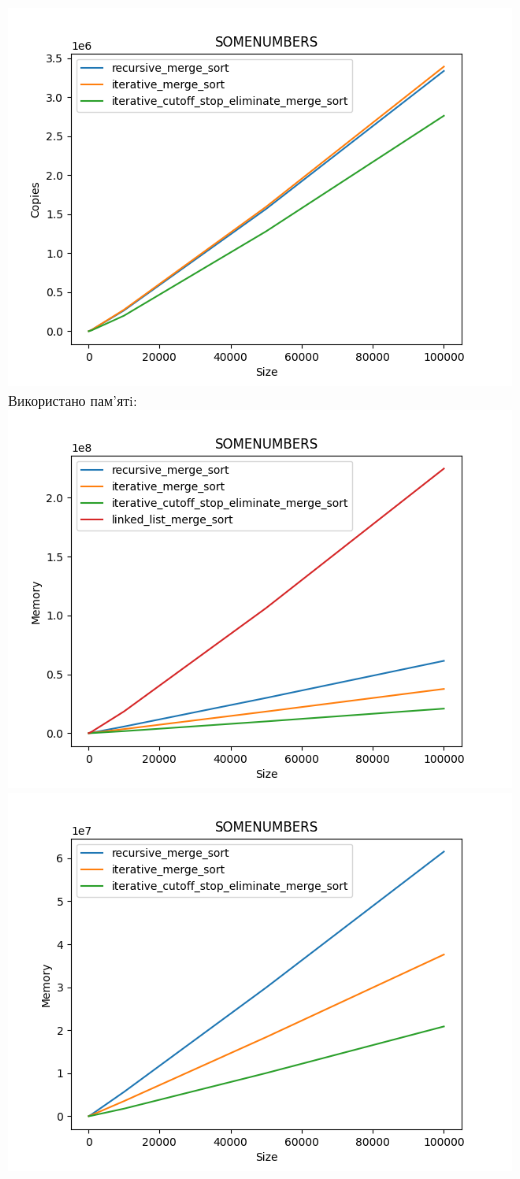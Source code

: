 \documentclass{article}
\begin{document}
        \includegraphics[scale=0.5]{somenumbers_Copies_3_sorts_6_numbers_50_100to100000.png}
    \newline
    Використано пам’ятi:
    \newline
        \includegraphics[scale=0.5]{somenumbers_Memory_4_sorts_6_numbers_50_100to100000.png}
        \includegraphics[scale=0.5]{somenumbers_Memory_3_sorts_6_numbers_50_100to100000.png}
    \newpage
\end{document}

